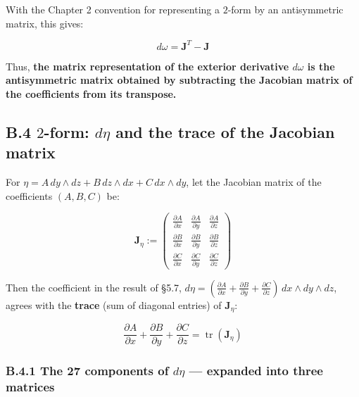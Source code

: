 \documentclass[a4paper,12pt,openany]{book}
\begin{document}
With the Chapter 2 convention for representing a \(2\)-form by an
antisymmetric matrix, this gives:

\[d\omega = \mathbf{J}^T - \mathbf{J}\]

Thus,
\textbf{the matrix representation of the exterior derivative $d\omega$ is the antisymmetric matrix obtained by subtracting the Jacobian matrix of the coefficients from its transpose.}

\hypertarget{b.4-2-form-deta-and-the-trace-of-the-jacobian-matrix}{%
\subsection*{\texorpdfstring{B.4 \(2\)-form: \(d\eta\) and the trace of
the Jacobian
matrix}{B.4 2-form: d\textbackslash eta and the trace of the Jacobian matrix}}\label{b.4-2-form-deta-and-the-trace-of-the-jacobian-matrix}}

For \(\eta = A\,dy \wedge dz + B\,dz \wedge dx + C\,dx \wedge dy\), let
the Jacobian matrix of the coefficients \((A,B,C)\) be:

\[\mathbf{J}_\eta := \begin{pmatrix}
\frac{\partial A}{\partial x} & \frac{\partial A}{\partial y} & \frac{\partial A}{\partial z} \\
\frac{\partial B}{\partial x} & \frac{\partial B}{\partial y} & \frac{\partial B}{\partial z} \\
\frac{\partial C}{\partial x} & \frac{\partial C}{\partial y} & \frac{\partial C}{\partial z}
\end{pmatrix}\]

Then the coefficient in the result of §5.7,
\(d\eta = (\frac{\partial A}{\partial x} + \frac{\partial B}{\partial y} + \frac{\partial C}{\partial z})\,dx \wedge dy \wedge dz\),
agrees with the \textbf{trace} (sum of diagonal entries) of
\(\mathbf{J}_\eta\):

\[\frac{\partial A}{\partial x} + \frac{\partial B}{\partial y} + \frac{\partial C}{\partial z} = \operatorname{tr}(\mathbf{J}_\eta)\]

\hypertarget{b.4.1-the-27-components-of-deta-expanded-into-three-matrices}{%
\subsubsection*{\texorpdfstring{B.4.1 The 27 components of \(d\eta\) —
expanded into three
matrices}{B.4.1 The 27 components of d\textbackslash eta — expanded into three matrices}}\label{b.4.1-the-27-components-of-deta-expanded-into-three-matrices}}
\end{document}
